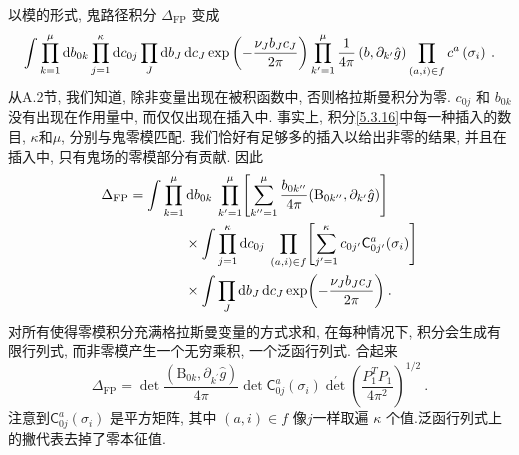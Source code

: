 以模的形式, 鬼路径积分 $\Delta_{\mathrm{FP}}$ 变成
\begin{equation}
	\int \prod_{k=1}^{\mu} \mathrm{d} b_{0 k} \prod_{j=1}^{\kappa} \mathrm{d} c_{0 j} \prod_{J} \mathrm{d} b_{J} \,\mathrm{d} c_{J} 
	\exp \left(-\frac{\nu_{J} b_{J} c_{J}}{2 \pi}\right) \prod_{k^{\prime}=1}^{\mu} \frac{1}{4 \pi}\left(b, \partial_{k^{\prime}} \hat{g}\right) \prod_{(a, i) \in f} c^{a}\left(\sigma_{i}\right) \:. \label{5.3.16}
\end{equation}
从A.2节, 我们知道, 除非变量出现在被积函数中, 否则格拉斯曼积分为零. $c_{0 j}$ 和 $b_{0 k}$ 没有出现在作用量中, 而仅仅出现在插入中. 事实上, 积分\eqref{5.3.16}中每一种插入的数目, $\kappa$和$\mu$, 分别与鬼零模匹配. 我们恰好有足够多的插入以给出非零的结果, 并且在插入中, 只有鬼场的零模部分有贡献. 因此
	\begin{align}
		\Delta_{\mathrm{FP}}&=\int \prod_{k=1}^{\mu}  \mathrm{d} b_{0 k} \:\prod_{k^{\prime}=1}^{\mu}\Biggl[\sum_{k^{\prime \prime}=1}^{\mu} \frac{b_{0 k^{\prime \prime}}}{4 \pi}(\mathrm{B}_{0 k^{\prime \prime}}, \partial_{k^{\prime}} \hat{g})\Biggr] \nonumber \\
		& \qquad \qquad \times \int \prod_{j=1}^{\kappa} \mathrm{d} c_{0 j} \: \prod_{(a, i) \in f}\Biggl[\sum_{j^{\prime}=1}^{\kappa} c_{0 j^{\prime}} \mathsf{C}_{0 j^{\prime}}^{a}(\sigma_{i})\Biggr] \nonumber \\
		& \qquad \qquad \times \int \prod_{J} \mathrm{d} b_{J}\, \mathrm{d} c_{J} \exp \biggl(-\frac{\nu_{J} b_{J} c_{J}}{2 \pi}\biggr) \:.\label{5.3.17}
	\end{align}
对所有使得零模积分充满格拉斯曼变量的方式求和, 在每种情况下, 积分会生成有限行列式, 而非零模产生一个无穷乘积, 一个泛函行列式. 合起来
\begin{equation}
	\Delta_{\mathrm{FP}}=\operatorname{det} \frac{\left(\mathrm{B}_{0 k}, \partial_{k^{\prime}} \hat{g}\right)}{4 \pi} \operatorname{det} \mathsf{C}_{0 j}^{a}\left(\sigma_{i}\right) \operatorname{det}^{\prime}\left(\frac{P_{1}^{T} P_{1}}{4 \pi^{2}}\right)^{1 / 2} \:.
	\label{5.3.18}
\end{equation}
注意到$\mathsf{C}_{0 j}^{a}(\sigma_{i})$ 是平方矩阵, 其中 $(a, i) \in f$ 像$j$一样取遍 $\kappa$ 个值.泛函行列式上的撇代表去掉了零本征值.

